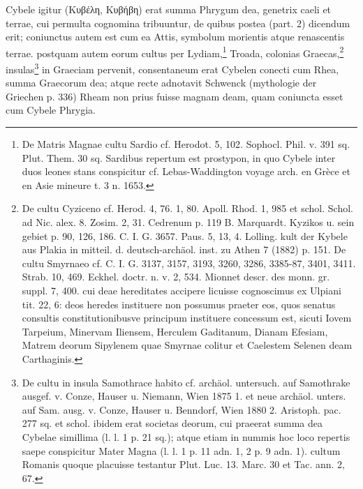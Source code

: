 \documentclass[a4paper, 11pt, oneside, polutonikogreek, german, twocolumn]{article}
\begin{document}
Cybele igitur (Κυβέλη, Κυβήβη) erat summa Phrygum dea, genetrix caeli et terrae, cui permulta cognomina tribuuntur, de quibus postea (part. 2) dicendum erit; coniunctus autem est cum ea Attis, symbolum morientis atque renascentis terrae. postquam autem eorum cultus per Lydiam,\footnote{De Matris Magnae cultu Sardio cf. Herodot. 5, 102. Sophocl. Phil. v. 391 sq. Plut. Them. 30 sq. Sardibus repertum est prostypon, in quo Cybele inter duos leones stans conspicitur cf. Lebas-Waddington voyage arch. en Grèce et en Asie mineure t. 3 n. 1653.} Troada, colonias Graecas,\footnote{De cultu Cyziceno cf. Herod. 4, 76. 1, 80. Apoll. Rhod. 1, 985 et schol. Schol. ad Nic. alex. 8. Zosim. 2, 31. Cedrenum p. 119 B. Marquardt. Kyzikos u. sein gebiet p. 90, 126, 186. C. I. G. 3657. Paus. 5, 13, 4. Lolling. kult der Kybele aus Plakia in mitteil. d. deutsch-archäol. inst. zu Athen 7 (1882) p. 151. De cultu Smyrnaeo cf. C. I. G. 3137, 3157, 3193, 3260, 3286, 3385-87, 3401, 3411. Strab. 10, 469. Eckhel. doctr. n. v. 2, 534. Mionnet descr. des monn. gr. suppl. 7, 400. cui deae hereditates accipere licuisse cognoscimus ex Ulpiani tit. 22, 6: deos heredes instituere non possumus praeter eos, quos senatus consultis constitutionibusve principum instituere concessum est, sicuti Iovem Tarpeium, Minervam Iliensem, Herculem Gaditanum, Dianam Efesiam, Matrem deorum Sipylenem quae Smyrnae colitur et Caelestem Selenen deam Carthaginis.} insulas\footnote{De cultu in insula Samothrace habito cf. archäol. untersuch. auf Samothrake ausgef. v. Conze, Hauser u. Niemann, Wien 1875 1. et neue archäol. unters. auf Sam. ausg. v. Conze, Hauser u. Benndorf, Wien 1880 2. Aristoph. pac. 277 sq. et schol. ibidem erat societas deorum, cui praeerat summa dea Cybelae simillima (l. l. 1 p. 21 sq.); atque etiam in nummis hoc loco repertis saepe conspicitur Mater Magna (l. l. 1 p. 11 adn. 1, 2 p. 9 adn. 1). cultum Romanis quoque placuisse testantur Plut. Luc. 13. Marc. 30 et Tac. ann. 2, 67.} in Graeciam pervenit, consentaneum erat Cybelen conecti cum Rhea, summa Graecorum dea; atque recte adnotavit Schwenck (mythologie der Griechen p. 336) Rheam non prius fuisse magnam deam, quam coniuncta esset cum Cybele Phrygia.
\end{document}
